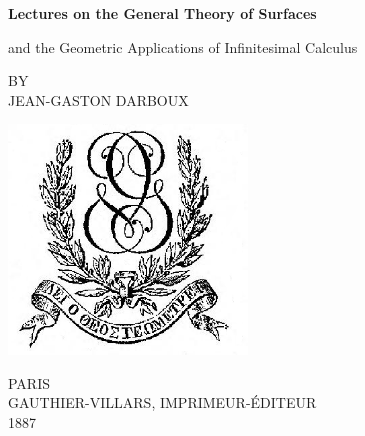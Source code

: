 \clearpage
\newcommand\nbvspace[1][3]{\vspace*{\stretch{#1}}}
\newcommand\nbstretchyspace{\spaceskip0.5em plus 0.25em minus 0.25em}
\newcommand{\nbtitlestretch}{\spaceskip0.6em}
\pagestyle{empty}
\begin{center}
\bfseries
\nbvspace[1]
\Huge
{\huge
Lectures on the General Theory of Surfaces}

\normalsize

and the Geometric Applications of Infinitesimal Calculus

\nbvspace[1]
\small BY\\
\Large JEAN-GASTON DARBOUX\\[0.5em]

\nbvspace[2]

\includegraphics[width=2.5in]{./title/Logo_Gauthier-Villars.png}
\nbvspace[3]
\normalsize

PARIS\\
\large
GAUTHIER-VILLARS, IMPRIMEUR-\'EDITEUR \\
1887
\nbvspace[1]
\end{center}